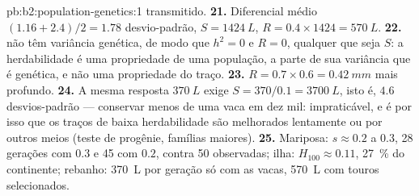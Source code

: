 \begin{solution}{pb:b2:population-genetics:1}
transmitido.
\textbf{21.} Diferencial médio $(1.16 + 2.4)/2 = 1.78$ desvio-padrão,
$S = \qty{1424}{L}$, $R = 0.4\times 1424 = \qty{570}{L}$.
\textbf{22.}  não têm variância genética, de modo que $h^{2} = 0$ e $R =
0$, qualquer que seja $S$: a herdabilidade é uma propriedade de uma
população, a parte de sua variância que é genética, e não uma propriedade
do traço.
\textbf{23.} $R = 0.7\times 0.6 = \qty{0.42}{mm}$ mais profundo.
\textbf{24.} A mesma resposta $\qty{370}{L}$ exige $S = 370/0.1 =
\qty{3700}{L}$, isto é, $4.6$ desvios-padrão --- conservar menos de
uma vaca em dez mil: impraticável, e é por isso que os traços de baixa
herdabilidade são melhorados lentamente ou por outros meios
(teste de progênie, famílias maiores).
\textbf{25.} Mariposa: $s \approx 0.2$ a $0.3$, 28 gerações com $0.3$
e 45 com $0.2$, contra 50 observadas; ilha: $H_{100} \approx 0.11$,
\qty{27}{\%} do continente; rebanho: \qty{370}{L} por geração só com as
vacas, \qty{570}{L} com touros selecionados.
\end{solution}
